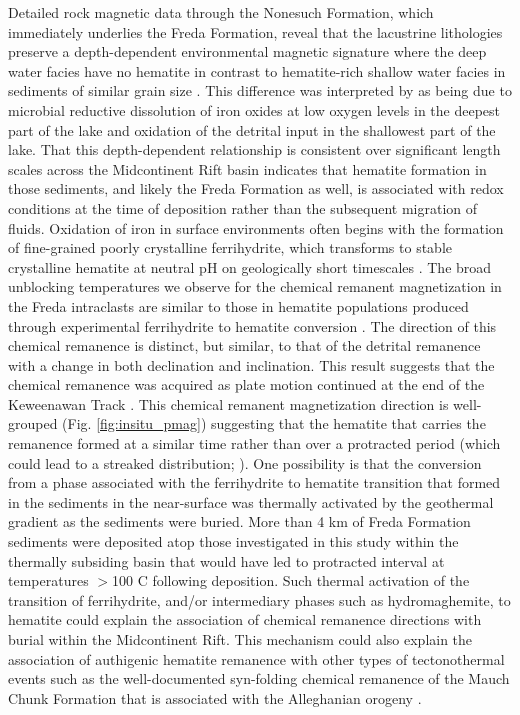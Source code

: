 \documentclass[draft]{agujournal2018}
\begin{document}
Detailed rock magnetic data through the Nonesuch Formation, which immediately underlies the Freda Formation, reveal that the lacustrine lithologies preserve a depth-dependent environmental magnetic signature where the deep water facies have no hematite in contrast to hematite-rich shallow water facies in sediments of similar grain size \citep{Slotznick2018b}. This difference was interpreted by \citet{Slotznick2018b} as being due to microbial reductive dissolution of iron oxides at low oxygen levels in the deepest part of the lake and oxidation of the detrital input in the shallowest part of the lake.  That this depth-dependent relationship is consistent over significant length scales across the Midcontinent Rift basin indicates that hematite formation in those sediments, and likely the Freda Formation as well, is associated with redox conditions at the time of deposition rather than the subsequent migration of fluids. Oxidation of iron in surface environments often begins with the formation of fine-grained poorly crystalline ferrihydrite, which transforms to stable crystalline hematite at neutral pH on geologically short timescales \citep{Cudennec2006a, Jiang2018a}. The broad unblocking temperatures we observe for the chemical remanent magnetization in the Freda intraclasts are similar to those in hematite populations produced through experimental ferrihydrite to hematite conversion \citep{Jiang2015a}. The direction of this chemical remanence is distinct, but similar, to that of the detrital remanence with a change in both declination and inclination. This result suggests that the chemical remanence was acquired as plate motion continued at the end of the Keweenawan Track \citep{Swanson-Hysell2018a}. This chemical remanent magnetization direction is well-grouped (Fig. \ref{fig:insitu_pmag}) suggesting that the hematite that carries the remanence formed at a similar time rather than over a protracted period (which could lead to a streaked distribution; \citealp{Beck2003b}). One possibility is that the conversion from a phase associated with the ferrihydrite to hematite transition that formed in the sediments in the near-surface was thermally activated by the geothermal gradient as the sediments were buried. More than 4 km of Freda Formation sediments were deposited atop those investigated in this study within the thermally subsiding basin that would have led to protracted interval at temperatures $>$100 \textdegree C following deposition. Such thermal activation of the transition of ferrihydrite, and/or intermediary phases such as hydromaghemite, to hematite could explain the association of chemical remanence directions with burial within the Midcontinent Rift. This mechanism could also explain the association of authigenic hematite remanence with other types of tectonothermal events such as the well-documented syn-folding chemical remanence of the Mauch Chunk Formation that is associated with the Alleghanian orogeny \citep{Kent1985b, Opdyke2004a}.
\end{document}
